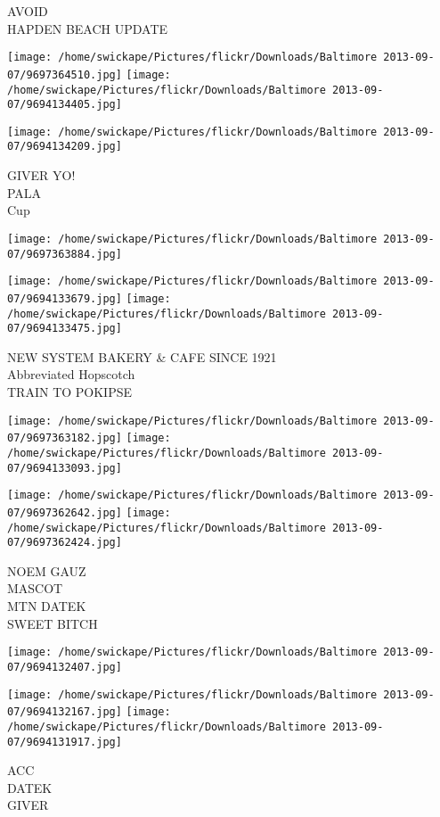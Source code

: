 \documentclass[10pt,letterpaper]{article}
\begin{document}
AVOID\\
HAPDEN BEACH UPDATE
\pagebreak

\texttt{[image: /home/swickape/Pictures/flickr/Downloads/Baltimore 2013-09-07/9697364510.jpg]}
\texttt{[image: /home/swickape/Pictures/flickr/Downloads/Baltimore 2013-09-07/9694134405.jpg]}

\texttt{[image: /home/swickape/Pictures/flickr/Downloads/Baltimore 2013-09-07/9694134209.jpg]}

GIVER YO!\\
PALA\\
Cup
\pagebreak

\texttt{[image: /home/swickape/Pictures/flickr/Downloads/Baltimore 2013-09-07/9697363884.jpg]}

\vspace{0.25in}
\texttt{[image: /home/swickape/Pictures/flickr/Downloads/Baltimore 2013-09-07/9694133679.jpg]}
\texttt{[image: /home/swickape/Pictures/flickr/Downloads/Baltimore 2013-09-07/9694133475.jpg]}

NEW SYSTEM BAKERY \& CAFE SINCE 1921\\
Abbreviated Hopscotch\\
TRAIN TO POKIPSE
\pagebreak

\texttt{[image: /home/swickape/Pictures/flickr/Downloads/Baltimore 2013-09-07/9697363182.jpg]}
\texttt{[image: /home/swickape/Pictures/flickr/Downloads/Baltimore 2013-09-07/9694133093.jpg]}

\texttt{[image: /home/swickape/Pictures/flickr/Downloads/Baltimore 2013-09-07/9697362642.jpg]}
\texttt{[image: /home/swickape/Pictures/flickr/Downloads/Baltimore 2013-09-07/9697362424.jpg]}

NOEM GAUZ\\
MASCOT\\
MTN DATEK\\
SWEET BITCH
\pagebreak

\texttt{[image: /home/swickape/Pictures/flickr/Downloads/Baltimore 2013-09-07/9694132407.jpg]}

\vspace{0.25in}
\texttt{[image: /home/swickape/Pictures/flickr/Downloads/Baltimore 2013-09-07/9694132167.jpg]}
\texttt{[image: /home/swickape/Pictures/flickr/Downloads/Baltimore 2013-09-07/9694131917.jpg]}

ACC\\
DATEK\\
GIVER
\pagebreak
\end{document}
